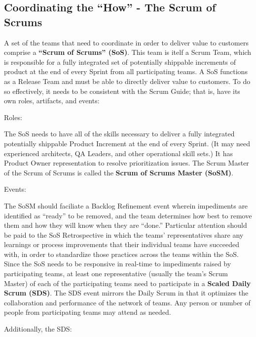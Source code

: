 \documentclass[12pt,a4paper,parskip=full]{scrartcl}
\begin{document}
\subsection{Coordinating the ``How'' - The Scrum of Scrums}
A set of the teams that need to coordinate in order to deliver value to customers comprise a \textbf{``Scrum of Scrums'' (SoS)}. This team is itelf a Scrum Team, which is responsible for a fully integrated set of potentially shippable increments of product at the end of every Sprint from all participating teams. A SoS functions as a Release Team and must be able to directly deliver value to customers. To do so effectively, it needs to be consistent with the Scrum Guide; that is, have its own roles, artifacts, and events:

Roles:

The SoS needs to have all of the skills necessary to deliver a fully integrated potentially shippable Product Increment at the end of every Sprint. (It may need experienced architects, QA Leaders, and other operational skill sets.) It has Product Owner representation to resolve prioritization issues.
The Scrum Master of the Scrum of Scrums is called the \textbf{Scrum of Scrums Master (SoSM)}.

Events:

The SoSM should faciliate a Backlog Refinement event wherein impediments are identified as ``ready'' to be removed, and the team determines how best to remove them and how they will know when they are ``done.''
Particular attention should be paid to the SoS Retrospective in which the teams' representatives share any learnings or process improvements that their individual teams have succeeded with, in order to standardize those practices across the teams within the SoS.  Since the SoS needs to be responsive in real-time to impediments raised by participating teams, at least one representative (usually the team's Scrum Master) of each of the participating teams need to participate in a \textbf{Scaled Daily Scrum (SDS)}. The SDS event mirrors the Daily Scrum in that it optimizes the collaboration and performance of the network of teams. Any person or number of people from participating teams may attend as needed.

Additionally, the SDS:
\end{document}
